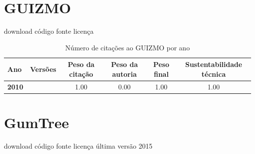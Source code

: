 \section{GUIZMO}
\checkmark download
\checkmark código fonte
\checkmark licença


\begin{table}[H]
\caption{Número de citações ao GUIZMO por ano}
\centering
\begin{tabular}{| l | c | c | c | c | c |}
  \hline
  Ano & Versões & Peso da citação & Peso da autoria & Peso final & Sustentabilidade técnica \\
  \hline
            {\bf 2010}
          &
          
          &
          1.00
          &
          0.00
          &
          1.00
          &
            {\color{blue} 1.00}
          \\
\hline
\end{tabular}
\end{table}



\section{GumTree}
\checkmark download
\checkmark código fonte
\checkmark licença
\checkmark última versão 2015


